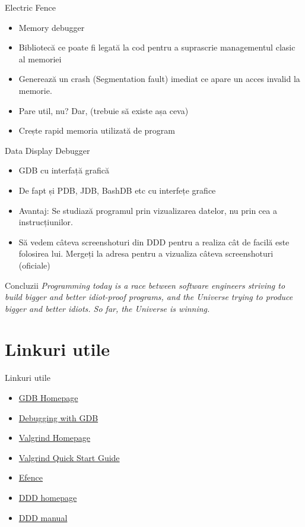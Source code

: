 \documentclass{beamer}
\begin{document}
\begin{frame}{Electric Fence}
\begin{itemize}
\item Memory debugger
\item Bibliotecă ce poate fi legată la cod pentru a suprascrie managementul clasic al memoriei
\item Generează un crash (Segmentation fault) imediat ce apare un acces invalid la memorie.
\item \pause Pare util, nu? \pause Dar, (trebuie să existe așa ceva)
\item \pause Crește rapid memoria utilizată de program
\end{itemize}
\end{frame}

\begin{frame}{Data Display Debugger}
\begin{itemize}
\item GDB cu interfață grafică
\item \pause De fapt și PDB, JDB, BashDB etc cu interfețe grafice
\item \pause Avantaj: \pause Se studiază programul prin vizualizarea datelor, nu prin cea a instrucțiunilor.
\item \pause Să vedem câteva screenshoturi din DDD pentru a realiza cât de facilă este folosirea lui. Mergeți la adresa \linebreak
pentru a vizualiza câteva screenshoturi (oficiale)
\end{itemize}
\end{frame}

\begin{frame}{Concluzii}
\textit{Programming today is a race between software engineers striving to build bigger and better idiot-proof programs, and the Universe trying to produce bigger and better idiots. So far, the Universe is winning.}
\end{frame}

\section{Linkuri utile}
\frame{\tableofcontents[currentsection]}
\begin{frame}{Linkuri utile}
\begin{itemize}
\item \href{http://www.gnu.org/software/gdb/}{GDB Homepage}
\item \href{http://sourceware.org/gdb/current/onlinedocs/gdb.html\#SEC_Top}{Debugging with GDB}
\item \href{http://valgrind.org/}{Valgrind Homepage}
\item \href{http://valgrind.org/docs/manual/QuickStart.html}{Valgrind Quick Start Guide}
\item \href{http://freshmeat.net/projects/efence/}{Efence}
\item \href{http://www.gnu.org/software/ddd/}{DDD homepage}
\item \href{http://www.gnu.org/manual/ddd/}{DDD manual}
\end{itemize}
\end{frame}
\end{document}
